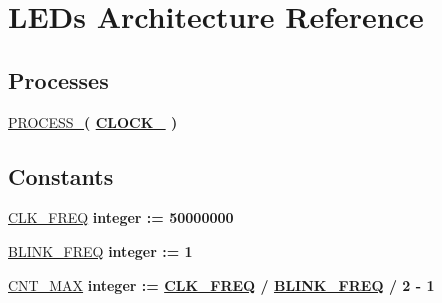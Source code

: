 \hypertarget{class_l_e_ds_1_1_l_e_ds}{}\section{L\+E\+Ds Architecture Reference}
\label{class_l_e_ds_1_1_l_e_ds}
\subsection*{Processes}
 \begin{DoxyCompactItemize}
\item 
\hyperlink{class_l_e_ds_1_1_l_e_ds_a0b2ae93f7930ef5bc4cc2730b8c405d1}{P\+R\+O\+C\+E\+S\+S\+\_}{\bfseries  ( {\bfseries {\bfseries \hyperlink{class_l_e_ds_a4b5e1e3eba67b2e61c77c9a719d8518c}{C\+L\+O\+C\+K\+\_}} \textcolor{vhdlchar}{ }} )}
\end{DoxyCompactItemize}
\subsection*{Constants}
 \begin{DoxyCompactItemize}
\item 
\hyperlink{class_l_e_ds_1_1_l_e_ds_aa45ed8f4ade73b3c1510f9df8ec7dd9c}{C\+L\+K\+\_\+\+F\+R\+E\+Q} {\bfseries \textcolor{comment}{integer}\textcolor{vhdlchar}{ }\textcolor{vhdlchar}{ }\textcolor{vhdlchar}{\+:}\textcolor{vhdlchar}{=}\textcolor{vhdlchar}{ }\textcolor{vhdlchar}{ } \textcolor{vhdldigit}{50000000} \textcolor{vhdlchar}{ }} 
\item 
\hyperlink{class_l_e_ds_1_1_l_e_ds_a1890617960a841a3d027f78733169e15}{B\+L\+I\+N\+K\+\_\+\+F\+R\+E\+Q} {\bfseries \textcolor{comment}{integer}\textcolor{vhdlchar}{ }\textcolor{vhdlchar}{ }\textcolor{vhdlchar}{\+:}\textcolor{vhdlchar}{=}\textcolor{vhdlchar}{ }\textcolor{vhdlchar}{ } \textcolor{vhdldigit}{1} \textcolor{vhdlchar}{ }} 
\item 
\hyperlink{class_l_e_ds_1_1_l_e_ds_a62b6ca896e870c8bfbd7496a8c89efe6}{C\+N\+T\+\_\+\+M\+A\+X} {\bfseries \textcolor{comment}{integer}\textcolor{vhdlchar}{ }\textcolor{vhdlchar}{ }\textcolor{vhdlchar}{\+:}\textcolor{vhdlchar}{=}\textcolor{vhdlchar}{ }\textcolor{vhdlchar}{ }\textcolor{vhdlchar}{ }\textcolor{vhdlchar}{ }{\bfseries \hyperlink{class_l_e_ds_1_1_l_e_ds_aa45ed8f4ade73b3c1510f9df8ec7dd9c}{C\+L\+K\+\_\+\+F\+R\+E\+Q}} \textcolor{vhdlchar}{/}\textcolor{vhdlchar}{ }\textcolor{vhdlchar}{ }\textcolor{vhdlchar}{ }{\bfseries \hyperlink{class_l_e_ds_1_1_l_e_ds_a1890617960a841a3d027f78733169e15}{B\+L\+I\+N\+K\+\_\+\+F\+R\+E\+Q}} \textcolor{vhdlchar}{/}\textcolor{vhdlchar}{ } \textcolor{vhdldigit}{2} \textcolor{vhdlchar}{-\/}\textcolor{vhdlchar}{ } \textcolor{vhdldigit}{1} \textcolor{vhdlchar}{ }} 
\end{DoxyCompactItemize}

